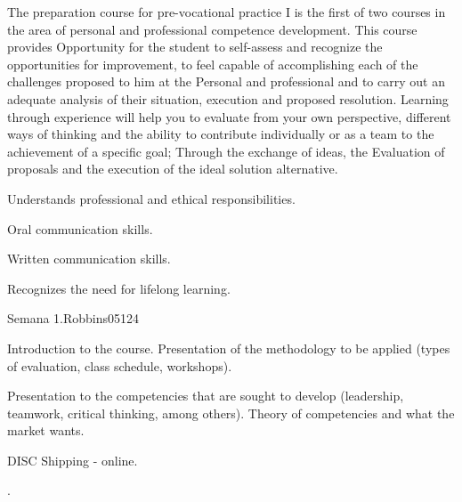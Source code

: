 \begin{syllabus}


\begin{justification}
The preparation course for pre-vocational practice I is the first of two courses in the area of personal and professional competence development. This course provides
Opportunity for the student to self-assess and recognize the opportunities for improvement, to feel capable of accomplishing each of the challenges proposed to him at the
Personal and professional and to carry out an adequate analysis of their situation, execution and proposed resolution.
Learning through experience will help you to evaluate from your own perspective, different ways of thinking and the ability to contribute individually or as a team to the achievement of a specific goal; Through the exchange of ideas, the
Evaluation of proposals and the execution of the ideal solution alternative.

\end{justification}

\begin{goals}
    \item Understands professional and ethical responsibilities.
    \item Oral communication skills.
    \item Written communication skills.
    \item Recognizes the need for lifelong learning.
\end{goals}

\begin{outcomes}
    \item {}
    \item {}
\end{outcomes}

\begin{competences}
    \item {}
\end{competences}

\begin{unit}{Semana 1.}{Robbins05}{12}{4}
   \begin{topics}
      \item Introduction to the course. Presentation of the methodology to be applied (types of evaluation, class schedule, workshops).
      \item Presentation to the competencies that are sought to develop (leadership, teamwork, critical thinking, among others). Theory of competencies and what the market wants.
      \item DISC Shipping - online.
   \end{topics}
   \begin{unitgoals}
      \item .
   \end{unitgoals}
\end{unit}


\end{syllabus}
